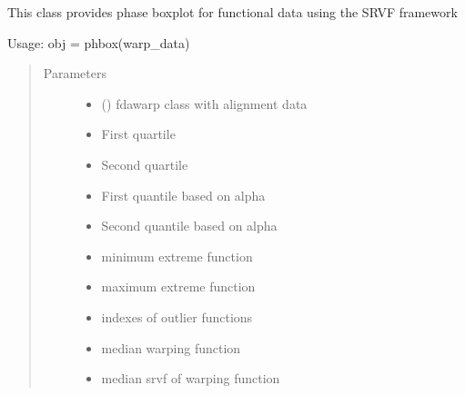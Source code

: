 \documentclass[letterpaper,10pt,english]{sphinxmanual}
\begin{document}
\begin{fulllineitems}
\label{\detokenize{boxplots:boxplots.phbox}}
This class provides phase boxplot for functional data using the
SRVF framework

Usage:  obj = phbox(warp\_data)
\begin{quote}\begin{description}
\item[{Parameters}] \leavevmode\begin{itemize}
\item {} 
 ({\hyperref[\detokenize{time_warping:time_warping.fdawarp}]{}}) \textendash{} fdawarp class with alignment data

\item {} 
 \textendash{} First quartile

\item {} 
 \textendash{} Second quartile

\item {} 
 \textendash{} First quantile based on alpha

\item {} 
 \textendash{} Second quantile based on alpha

\item {} 
 \textendash{} minimum extreme function

\item {} 
 \textendash{} maximum extreme function

\item {} 
 \textendash{} indexes of outlier functions

\item {} 
 \textendash{} median warping function

\item {} 
 \textendash{} median srvf of warping function


\end{itemize}
\end{description}
\end{quote}
\end{fulllineitems}
\end{document}
